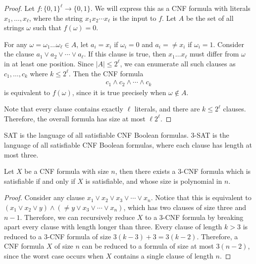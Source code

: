 \begin{proof}
    Let $f: \{0, 1\}^{\ell} \to \{0, 1\}$. We will express this as a CNF formula with literals $x_1, \ldots, x_{\ell}$, where the string $x_1x_2\cdots x_{\ell}$ is the input to $f$. Let $A$ be the set of all strings $\omega$ such that $f(\omega) = 0$.

    For any $\omega = \omega_1\ldots \omega_{\ell} \in A$, let $a_i = x_i$ if $\omega_i = 0$ and $a_i = \neq x_i$ if $\omega_i = 1$. Consider the clause $a_1 \lor a_2 \lor \cdots \lor a_{\ell}$. If this clause is true, then $x_1\ldots x_{\ell}$ must differ from $\omega$ in at least one position. Since $|A| \leq 2^{\ell}$, we can enumerate all such clauses as $c_1, \ldots, c_{k}$ where $k \leq 2^{\ell}$. Then the CNF formula
    \begin{align*}
        c_1 \land c_2 \land \cdots \land c_{k}
    \end{align*}
    is equivalent to $f(\omega)$, since it is true precisely when $\omega \not\in A$.

    Note that every clause contains exactly $\ell$ literals, and there are $k \leq 2^{\ell}$ clauses. Therefore, the overall formula has size at most $\ell 2^{\ell}$.
\end{proof}

\begin{defn}
    SAT is the language of all satisfiable CNF Boolean formulas. 3-SAT is the language of all satisfiable CNF Boolean formulas, where each clause has length at most three.
\end{defn}

\begin{lemma}\label{CNF-to-3-CNF}
    Let $X$ be a CNF formula with size $n$, then there exists a 3-CNF formula which is satisfiable if and only if $X$ is satisfiable, and whose size is polynomial in $n$.
\end{lemma}

\begin{proof}
    Consider any clause $x_1 \lor x_2 \lor x_3 \lor \cdots \lor x_n$. Notice that this is equivalent to $(x_1 \lor x_2 \lor y) \land (\neq y \lor x_3 \lor \cdots \lor x_n)$, which has two clauses of size three and $n-1$. Therefore, we can recursively reduce $X$ to a 3-CNF formula by breaking apart every clause with length longer than three. Every clause of length $k > 3$ is reduced to a 3-CNF formula of size $3(k-3) + 3 = 3(k-2)$. Therefore, a CNF formula $X$ of size $n$ can be reduced to a formula of size at most $3(n-2)$, since the worst case occurs when $X$ contains a single clause of length $n$.
\end{proof}

